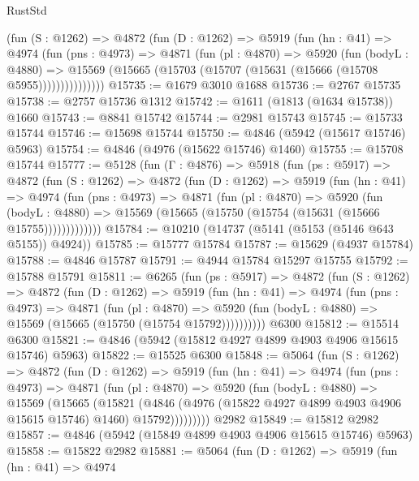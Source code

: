 \begin{lexlean}{RustStd}
\begin{coremodule}
          (fun (S : @1262) =>
          @4872
            (fun (D : @1262) =>
            @5919
              (fun (hn : @41) =>
              @4974
                (fun (pns : @4973) =>
                @4871
                  (fun (pl : @4870) =>
                  @5920
                    (fun (bodyL : @4880) =>
                    @15569 (@15665 (@15703 (@15707 (@15631 (@15666 (@15708 @5955)))))))))))))))
@15735 := @1679 @3010 @1688
@15736 := @2767 @15735
@15738 := @2757 @15736 @1312
@15742 := @1611 (@1813 (@1634 @15738)) @1660
@15743 := @8841 @15742
@15744 := @2981 @15743
@15745 := @15733 @15744
@15746 := @15698 @15744
@15750 := @4846 (@5942 (@15617 @15746) @5963)
@15754 := @4846 (@4976 (@15622 @15746) @1460)
@15755 := @15708 @15744
@15777 := @5128
    (fun (Γ : @4876) =>
    @5918
      (fun (ps : @5917) =>
      @4872
        (fun (S : @1262) =>
        @4872
          (fun (D : @1262) =>
          @5919
            (fun (hn : @41) =>
            @4974
              (fun (pns : @4973) =>
              @4871
                (fun (pl : @4870) =>
                @5920
                  (fun (bodyL : @4880) =>
                  @15569 (@15665 (@15750 (@15754 (@15631 (@15666 @15755)))))))))))))
@15784 := @10210 (@14737 (@5141 (@5153 (@5146 @643 @5155)) @4924))
@15785 := @15777 @15784
@15787 := @15629 (@4937 @15784)
@15788 := @4846 @15787
@15791 := @4944 @15784 @15297 @15755
@15792 := @15788 @15791
@15811 := @6265
    (fun (ps : @5917) =>
    @4872
      (fun (S : @1262) =>
      @4872
        (fun (D : @1262) =>
        @5919
          (fun (hn : @41) =>
          @4974
            (fun (pns : @4973) =>
            @4871
              (fun (pl : @4870) =>
              @5920 (fun (bodyL : @4880) => @15569 (@15665 (@15750 (@15754 @15792))))))))))
    @6300
@15812 := @15514 @6300
@15821 := @4846 (@5942 (@15812 @4927 @4899 @4903 @4906 @15615 @15746) @5963)
@15822 := @15525 @6300
@15848 := @5064
    (fun (S : @1262) =>
    @4872
      (fun (D : @1262) =>
      @5919
        (fun (hn : @41) =>
        @4974
          (fun (pns : @4973) =>
          @4871
            (fun (pl : @4870) =>
            @5920
              (fun (bodyL : @4880) =>
              @15569
                (@15665
                  (@15821
                    (@4846
                      (@4976 (@15822 @4927 @4899 @4903 @4906 @15615 @15746) @1460)
                      @15792)))))))))
    @2982
@15849 := @15812 @2982
@15857 := @4846 (@5942 (@15849 @4899 @4903 @4906 @15615 @15746) @5963)
@15858 := @15822 @2982
@15881 := @5064
    (fun (D : @1262) =>
    @5919
      (fun (hn : @41) =>
      @4974

\end{coremodule}
\end{lexlean}

